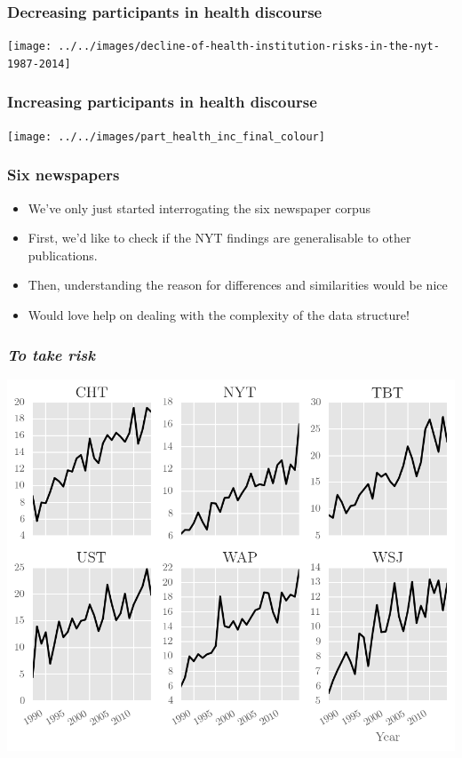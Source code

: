 \documentclass{beamer}       %
\begin{document}
\begin{frame}
    \frametitle{Decreasing participants in health discourse}
    \centering
    \texttt{[image: ../../images/decline-of-health-institution-risks-in-the-nyt-1987-2014]}
\end{frame}

\begin{frame}
    \frametitle{Increasing participants in health discourse}
    \centering
    \texttt{[image: ../../images/part\_health\_inc\_final\_colour]}
\end{frame}

\begin{frame}\frametitle{Six newspapers}
\begin{itemize}
\item We've only just started interrogating the six newspaper corpus
\item First, we'd like to check if the NYT findings are generalisable to other publications.
\item Then, understanding the reason for differences and similarities would be nice
\item Would love help on dealing with the complexity of the data structure!
\end{itemize}
\end{frame}

\begin{frame}\frametitle{\emph{To take risk}}
    \centering
    \includegraphics[width=.9\textwidth]{../../images/to-put-at-risk}
\end{frame}
\end{document}
